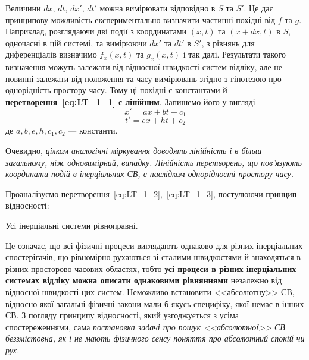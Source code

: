 Величини $dx$, $dt$, $dx'$, $dt'$ можна вимірювати відповідно в $S$ та $S'$. Це дає принципову можливість
експериментально визначити частинні похідні від $f$ та $g$. Наприклад, розглядаючи дві події з координатами $(x,t)$ та
$(x+dx,t)$ в $S$, одночасні в цій системі, та вимірюючи $dx'$ та $dt'$ в $S'$, з рівнянь для диференціалів визначимо
$f_x(x,t)$ та $g_x(x,t)$ і так далі. Результати такого визначення можуть залежати від відносної швидкості систем
відліку, але не повинні залежати від положення та часу вимірювань згідно з гіпотезою про однорідність простору-часу.
Тому ці похідні є константами й \textbf{перетворення~\eqref{eq:LT_1_1} є лінійним}. Запишемо його у вигляді
\begin{equation} \label{eq:LT_1_2}
	x'=ax+bt+c_1
\end{equation}
\begin{equation} \label{eq:LT_1_3}
	t'=ex+ht+c_2
\end{equation}
де $a,b,e,h,c_1,c_2$ --- константи.



Очевидно, \emph{цілком аналогічні міркування доводять лінійність і в більш загальному, ніж одновимірний, випадку.
Лінійність перетворень, що пов'язують координати подій в інерціальних СВ, є наслідком однорідності простору-часу.}

Проаналізуємо перетворення~\eqref{eq:LT_1_2},~\eqref{eq:LT_1_3}, постулюючи принцип відносності:

\begin{postulate}{}
    Усі інерціальні системи рівноправні.
\end{postulate}

Це означає, що всі фізичні процеси виглядають однаково для різних інерціальних спостерігачів, що рівномірно рухаються зі
сталими швидкостями й знаходяться в різних просторово-часових областях, тобто \textbf{усі процеси в різних інерціальних
системах відліку можна описати однаковими  рівняннями }незалежно від відносної швидкості цих систем. Неможливо
встановити <<абсолютну>> СВ, відносно якої загальні фізичні закони мали б якусь специфіку, якої немає в інших СВ. З
погляду принципу відносності, який  узгоджується з усіма спостереженнями, сама \emph{постановка задачі про пошук
<<абсолютної>> СВ беззмістовна, як і не мають фізичного сенсу поняття про абсолютний спокій чи рух.}


